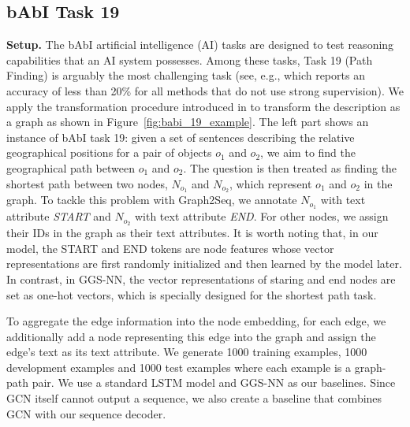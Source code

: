 \documentclass{article} \usepackage{iclr2019_conference,times}
\begin{document}
\subsection{bAbI Task 19}
\textbf{Setup.} The bAbI artificial intelligence (AI) tasks \citep{DBLP:journals/corr/WestonBCM15} are designed to test reasoning capabilities that an AI system possesses.
Among these tasks, Task 19 (Path Finding) is arguably the most challenging task (see, e.g., \citep{DBLP:conf/nips/SukhbaatarSWF15} which reports an accuracy of less than 20\% for all methods that do not use strong supervision). We apply the transformation procedure introduced in \citep{li2015gated} to transform the description as a graph as shown in Figure~\ref{fig:babi_19_example}. The left part shows an instance of bAbI task 19: given a set of sentences describing the relative geographical positions for a pair of objects $o_{1}$ and $o_{2}$, we aim to find the geographical path between $o_{1}$ and $o_{2}$. The question is then treated as finding the shortest path between two nodes, $N_{o_{1}}$ and $N_{o_{2}}$, which represent $o_{1}$ and $o_{2}$ in the graph. To tackle this problem with Graph2Seq, we annotate $N_{o_{1}}$ with text attribute \textit{START} and $N_{o_{2}}$ with text attribute \textit{END}. For other nodes, we assign their IDs in the graph as their text attributes. It is worth noting that, in our model, the START and END tokens are node features whose vector representations are first randomly initialized and then learned by the model later. In contrast, in GGS-NN, the vector representations of staring and end nodes are set as one-hot vectors, which is specially designed for the shortest path task.

To aggregate the edge information into the node embedding, for each edge,  we additionally add a node representing this edge into the graph and assign the edge's text as its text attribute.
We generate 1000 training examples, 1000 development examples and 1000 test examples where each example is a graph-path pair. We use a standard LSTM model \citep{hochreiter1997long} and GGS-NN \citep{li2015gated} as our baselines. Since GCN \citep{kipf2016semi} itself cannot output a sequence, we also create a baseline that combines GCN with our sequence decoder. 
\end{document}
